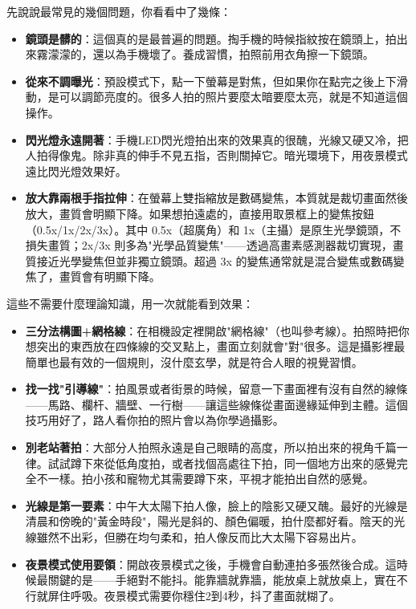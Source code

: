 


先說說最常見的幾個問題，你看看中了幾條：

\begin{itemize}
  \item \textbf{鏡頭是髒的}：這個真的是最普遍的問題。掏手機的時候指紋按在鏡頭上，拍出來霧濛濛的，還以為手機壞了。養成習慣，拍照前用衣角擦一下鏡頭。
  \item \textbf{從來不調曝光}：預設模式下，點一下螢幕是對焦，但如果你在點完之後上下滑動，是可以調節亮度的。很多人拍的照片要麼太暗要麼太亮，就是不知道這個操作。
  \item \textbf{閃光燈永遠開著}：手機LED閃光燈拍出來的效果真的很醜，光線又硬又冷，把人拍得像鬼。除非真的伸手不見五指，否則關掉它。暗光環境下，用夜景模式遠比閃光燈效果好。
  \item \textbf{放大靠兩根手指拉伸}：在螢幕上雙指縮放是數碼變焦，本質就是裁切畫面然後放大，畫質會明顯下降。如果想拍遠處的，直接用取景框上的變焦按鈕（0.5x/1x/2x/3x）。其中 0.5x（超廣角）和 1x（主攝）是原生光學鏡頭，不損失畫質；2x/3x 則多為"光學品質變焦"——透過高畫素感測器裁切實現，畫質接近光學變焦但並非獨立鏡頭。超過 3x 的變焦通常就是混合變焦或數碼變焦了，畫質會有明顯下降。
\end{itemize}


這些不需要什麼理論知識，用一次就能看到效果：

\begin{itemize}
  \item \textbf{三分法構圖+網格線}：在相機設定裡開啟"網格線"（也叫參考線）。拍照時把你想突出的東西放在四條線的交叉點上，畫面立刻就會"對"很多。這是攝影裡最簡單也最有效的一個規則，沒什麼玄學，就是符合人眼的視覺習慣。
  \item \textbf{找一找"引導線"}：拍風景或者街景的時候，留意一下畫面裡有沒有自然的線條——馬路、欄杆、牆壁、一行樹——讓這些線條從畫面邊緣延伸到主體。這個技巧用好了，路人看你拍的照片會以為你學過攝影。
  \item \textbf{別老站著拍}：大部分人拍照永遠是自己眼睛的高度，所以拍出來的視角千篇一律。試試蹲下來從低角度拍，或者找個高處往下拍，同一個地方出來的感覺完全不一樣。拍小孩和寵物尤其需要蹲下來，平視才能拍出自然的感覺。
  \item \textbf{光線是第一要素}：中午大太陽下拍人像，臉上的陰影又硬又醜。最好的光線是清晨和傍晚的"黃金時段"，陽光是斜的、顏色偏暖，拍什麼都好看。陰天的光線雖然不出彩，但勝在均勻柔和，拍人像反而比大太陽下容易出片。
  \item \textbf{夜景模式使用要領}：開啟夜景模式之後，手機會自動連拍多張然後合成。這時候最關鍵的是——手絕對不能抖。能靠牆就靠牆，能放桌上就放桌上，實在不行就屏住呼吸。夜景模式需要你穩住2到4秒，抖了畫面就糊了。
\end{itemize}

